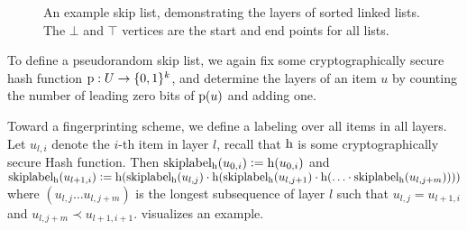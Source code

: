 \newcommand{\toweredges}[2]{
\foreach \y in {1,...,#2}
{
    \pgfmathtruncatemacro{\myPrev}{\y-1}
    \draw (n#1\y) edge[edge] (n#1\myPrev);
}
}

\newcommand{\listedges}[2]{
\foreach \y in {0,...,#2}
{
    \pgfmathtruncatemacro{\myPrev}{#1-1}
    \draw (n#1\y) edge[edge] (n\myPrev\y);
}
}

\begin{figure*}
\begin{scaletikzpicturetowidth}{\textwidth}
\end{scaletikzpicturetowidth}

\caption{
An example skip list, demonstrating the layers of sorted linked lists. The $\bot$ and $\top$ vertices are the start and end points for all lists.
}

\label{fig:skip-list-example}
\end{figure*}

To define a pseudorandom skip list, we again fix some cryptographically secure hash function ${\operatorname{p}}: {U} \rightarrow {\{0, 1\}^k}$, and determine the layers of an item $u$ by counting the number of leading zero bits of $\operatorname{p}(u)$ and adding one.

Toward a fingerprinting scheme, we define a labeling over all items in all layers. Let $u_{l, i}$ denote the $i$-th item in layer $l$, recall that $\operatorname{h}$ is some cryptographically secure Hash function.
Then $\operatorname{skiplabel_{\operatorname{h}}}(u_{0, i}) \vcentcolon= \operatorname{h}(u_{0, i})$ and $\operatorname{skiplabel_{\operatorname{h}}}(u_{l + 1, i}) \vcentcolon= \operatorname{h}(\operatorname{skiplabel_{\operatorname{h}}}(u_{l, j}) \cdot \operatorname{h}( \operatorname{skiplabel_{\operatorname{h}}}(u_{l, j + 1}) \cdot \operatorname{h}(\ldots \cdot \operatorname{skiplabel_{\operatorname{h}}}(u_{l, j + m}))))$ where $(u_{l, j} \ldots u_{l, j + m})$ is the longest subsequence of layer $l$ such that $u_{l, j} = u_{l + 1, i}$ and $u_{l, j + m} \prec u_{l + 1, i + 1}$.  visualizes an example.


